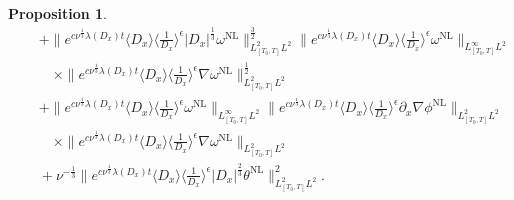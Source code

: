 \documentclass[reqno, 12pt]{amsart} %
\theoremstyle{plain} %
\newtheorem{Prop}[Thm]{Proposition}
\theoremstyle{definition}
\theoremstyle{remark}
\numberwithin{equation}{section} %
\newcommand{\px}{\partial_x}
\begin{document}
\begin{Prop}
{\begin{align*}
				&\quad + \|e^{c \nu^{\frac{1}{3}} \lambda\left(D_x\right) t}\langle D_x\rangle    \langle \frac{1}{D_x}\rangle^\epsilon  \left|D_x\right|^{\frac{1}{3}}\omega^{\mathrm{NL}}\|_{L_{[T_0, T]}^2L^2}^\frac32 \|e^{c \nu^{\frac{1}{3}} \lambda\left(D_x\right) t}\langle D_x\rangle\langle\frac{1}{D_x}\rangle^\epsilon \omega^{\mathrm{NL}}\|_{L_{[T_0, T]}^\infty L^2} \\
				& \qquad \times\|e^{c \nu^{\frac{1}{3}} \lambda\left(D_x\right) t}\langle D_x\rangle\langle\frac{1}{D_x}\rangle^\epsilon \nabla  \omega^{\mathrm{NL}}\|_{L_{[T_0, T]}^2 L^2}^\frac12 \\
				& \quad + \|e^{c \nu^{\frac{1}{3}} \lambda\left(D_x\right) t}\langle D_x\rangle    \langle \frac{1}{D_x}\rangle^\epsilon  \omega^{\mathrm{NL}}\|_{L_{[T_0, T]}^\infty L^2} \|e^{c \nu^{\frac{1}{3}} \lambda\left(D_x\right) t}\langle D_x\rangle\langle\frac{1}{D_x}\rangle^\epsilon \px \nabla \phi^{\mathrm{NL}}\|_{L_{[T_0, T]}^2L^2} \\
				& \qquad \times\|e^{c \nu^{\frac{1}{3}} \lambda\left(D_x\right) t}\langle D_x\rangle\langle\frac{1}{D_x}\rangle^\epsilon \nabla \omega^{\mathrm{NL}}\|_{L_{[T_0, T]}^2L^2} \\
				&\quad + \nu^{-\frac13 }\| e^{c \nu^{\frac{1}{3}} \lambda\left(D_x\right) t}\langle D_x\rangle\langle\frac{1}{D_x}\rangle^\epsilon |D_x|^\frac23 \theta^{\mathrm{NL}}  \|_{L_{[T_0, T]}^2L^2}^2.
		\end{align*} }
	\end{Prop}
\end{document}

